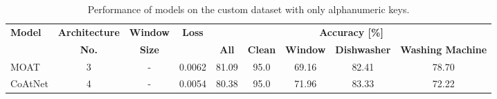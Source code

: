\documentclass[a4paper,11pt,twoside]{report}
\theoremstyle{definition}
\begin{document}
\begin{table}[h!]
\centering
\caption{Performance of  models on the custom dataset with only alphanumeric keys.}
\begin{adjustbox}{max width=\textwidth}
\begin{tabular}{l|c|c|c|ccccc}
\hline
\textbf{Model} & \textbf{Architecture} & \textbf{Window} & \textbf{Loss} & \multicolumn{5}{c}{\textbf{Accuracy [\%]}} \\
\cline{5-9}
       &   \textbf{No.}  &   \textbf{Size}   &   & \textbf{All} & \textbf{Clean} & \textbf{Window} & \textbf{Dishwasher} & \textbf{Washing Machine}  \\
\hline
MOAT & 3 & - & 0.0062 & 81.09 & 95.0 & 69.16 & 82.41 & 78.70 \\
CoAtNet & 4 & - & 0.0054 & 80.38 & 95.0 & 71.96 & 83.33 & 72.22 \\
\hline
\end{tabular}
\end{adjustbox}
\label{tab:custom_alphanumeric}
\end{table}
\end{document}
